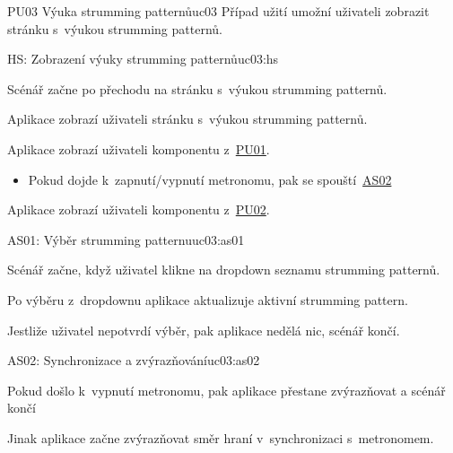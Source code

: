 \begin{usecase}{PU03 Výuka strumming patternů}{uc03}
    Případ užití umožní uživateli zobrazit stránku s~výukou strumming patternů.

    \begin{scenario}{HS: Zobrazení výuky strumming patternů}{uc03:hs}
        \item Scénář začne po přechodu na stránku s~výukou strumming patternů.
        \item Aplikace zobrazí uživateli stránku s~výukou strumming patternů.
        \item Aplikace zobrazí uživateli komponentu z~\hyperref[uc01]{PU01}.
        \begin{itemize}
            \item Pokud dojde k~zapnutí/vypnutí metronomu, pak se spouští~\hyperref[uc3:as02]{AS02}
        \end{itemize}
        \item Aplikace zobrazí uživateli komponentu z~\hyperref[uc02]{PU02}.
    \end{scenario}


    \begin{scenario}{AS01: Výběr strumming patternu}{uc03:as01}
        \item Scénář začne, když uživatel klikne na dropdown seznamu strumming patternů.
        \item Po výběru z~dropdownu aplikace aktualizuje aktivní strumming pattern.
        \item Jestliže uživatel nepotvrdí výběr, pak aplikace nedělá nic, scénář končí.

    \end{scenario}

    \begin{scenario}{AS02: Synchronizace a zvýrazňování}{uc03:as02}
        \item Pokud došlo k~vypnutí metronomu, pak aplikace přestane zvýrazňovat a scénář končí
        \item Jinak aplikace začne zvýrazňovat směr hraní v~synchronizaci s~metronomem.
    \end{scenario}
\end{usecase}